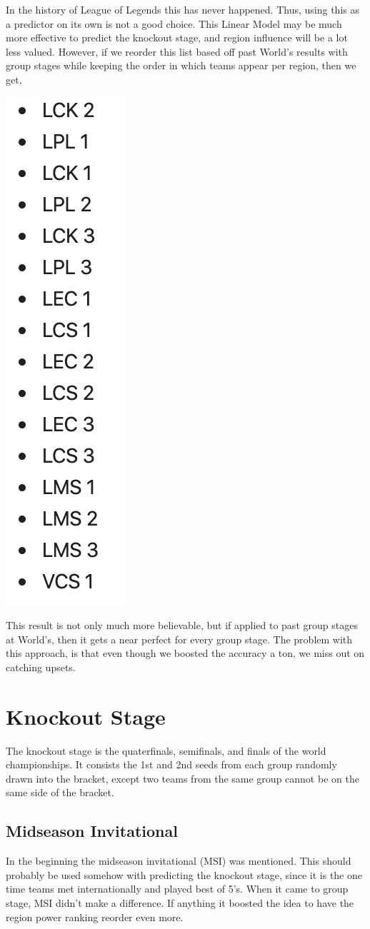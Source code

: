 \documentclass[11pt]{article}
\theoremstyle{plain}
\theoremstyle{definition}
\numberwithin{equation}{section}
\numberwithin{theorem}{section}
\numberwithin{lemma}{section}
\numberwithin{definition}{section}
\numberwithin{proposition}{section}
\numberwithin{corollary}{section}
\begin{document}
	In the history of League of Legends this has never happened. Thus, using this as a predictor on its own is not a good choice. This Linear Model may be much more effective to predict the knockout stage, and region influence will be a lot less valued. However, if we reorder this list based off past World's results with group stages while keeping the order in which teams appear per region, then we get,
	\begin{center}
		\includegraphics[width=.75in]{CorrectedRR}
	\end{center}
	
	This result is not only much more believable, but if applied to past group stages at World's, then it gets a near perfect for every group stage. The problem with this approach, is that even though we boosted the accuracy a ton, we miss out on catching upsets.
\section{Knockout Stage}	
	The knockout stage is the quaterfinals, semifinals, and finals of the world championships. It consists the 1st and 2nd seeds from each group randomly drawn into the bracket, except two teams from the same group cannot be on the same side of the bracket.

\subsection{Midseason Invitational}
	In the beginning the midseason invitational (MSI) was mentioned. This should probably be used somehow with predicting the knockout stage, since it is the one time teams met internationally and played best of 5's. When it came to group stage, MSI didn't make a difference. If anything it boosted the idea to have the region power ranking reorder even more.
	
\end{document}
